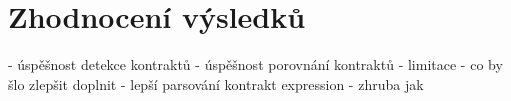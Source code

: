 \chapter{Zhodnocení výsledků}

 - úspěšnost detekce kontraktů
 - úspěšnost porovnání kontraktů
 - limitace
 - co by šlo zlepšit doplnit
  - lepší parsování kontrakt expression - zhruba jak
